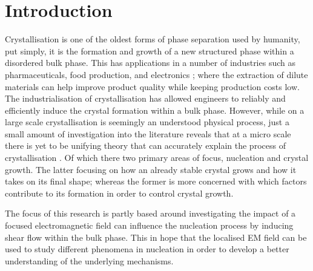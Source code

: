 \chapter{Introduction}
Crystallisation is one of the oldest forms of phase separation 
used by humanity\cite{Schoen1956}, put simply, it is the 
formation and growth of a new structured phase within 
a disordered bulk phase. This has applications in a 
number of industries such as pharmaceuticals, food 
production, and electronics \cite{Myerson2002}; where 
the extraction of dilute materials can help improve 
product quality while keeping production costs low. 
The industrialisation of crystallisation has allowed 
engineers to reliably and efficiently induce the crystal 
formation within a bulk phase. However, while on a 
large scale crystallisation is seemingly an understood 
physical process, just a small amount of investigation 
into the literature reveals that at a micro scale there 
is yet to be unifying theory that can accurately explain 
the process of crystallisation \cite{Fu2021}. Of which 
there two primary areas of focus, nucleation and crystal 
growth. The latter focusing on how an already stable 
crystal grows and how it takes on its final shape; 
whereas the former is more concerned with which factors 
contribute to its formation in order to control crystal growth.

The focus of this research is partly based around investigating
the impact of a focused electromagnetic field can influence the 
nucleation process by inducing shear flow within the bulk phase. 
This in hope that the localised EM field can be used to study 
different phenomena in nucleation in order to develop a better
understanding of the underlying mechanisms.

